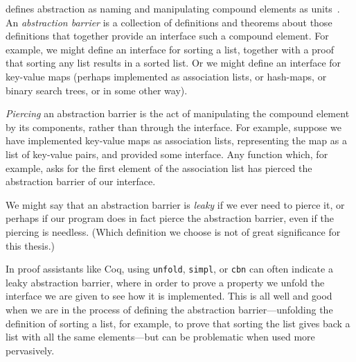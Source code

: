 defines abstraction as naming and manipulating compound elements as units~\cite[p.~6]{Structure1996Sussman}.
An \emph{abstraction barrier} is a collection of definitions and theorems about those definitions that together provide an interface such a compound element.
For example, we might define an interface for sorting a list, together with a proof that sorting any list results in a sorted list.
Or we might define an interface for key-value maps (perhaps implemented as association lists, or hash-maps, or binary search trees, or in some other way).

\emph{Piercing} an abstraction barrier is the act of manipulating the compound element by its components, rather than through the interface.
For example, suppose we have implemented key-value maps as association lists, representing the map as a list of key-value pairs, and provided some interface.
Any function which, for example, asks for the first element of the association list has pierced the abstraction barrier of our interface.

We might say that an abstraction barrier is \emph{leaky} if we ever need to pierce it, or perhaps if our program does in fact pierce the abstraction barrier, even if the piercing is needless.
(Which definition we choose is not of great significance for this thesis.)

In proof assistants like Coq, using \texttt{unfold}, \texttt{simpl}, or \texttt{cbn} can often indicate a leaky abstraction barrier, where in order to prove a property we unfold the interface we are given to see how it is implemented.
This is all well and good when we are in the process of defining the abstraction barrier---unfolding the definition of sorting a list, for example, to prove that sorting the list gives back a list with all the same elements---but can be problematic when used more pervasively.

